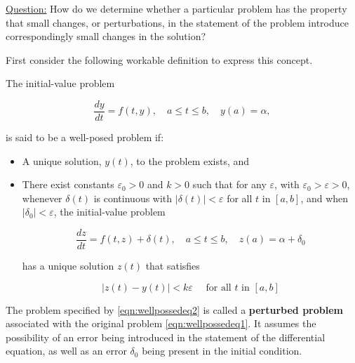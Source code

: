 \begin{boxB}
\underline{Question:} How do we determine whether a particular problem has the property that small changes, or perturbations, in the statement of the problem introduce correspondingly small changes in the solution?
\end{boxB}

First consider the following workable definition to express this concept.

\begin{definition} 
The initial-value problem

\begin{equation}\label{eqn:wellpossedeq1}
\frac{d y}{d t}=f(t, y), \quad a \leq t \leq b, \quad y(a)=\alpha,
\end{equation}

is said to be a well-posed problem if:

\begin{itemize}
  \item A unique solution, $y(t)$, to the problem exists, and
  \item There exist constants $\varepsilon_{0}>0$ and $k>0$ such that for any $\varepsilon$, with $\varepsilon_{0}>\varepsilon>0$, whenever $\delta(t)$ is continuous with $|\delta(t)|<\varepsilon$ for all $t$ in $[a, b]$, and when $\left|\delta_{0}\right|<\varepsilon$, the initial-value problem


\begin{equation}\label{eqn:wellpossedeq2}
\frac{d z}{d t}=f(t, z)+\delta(t), \quad a \leq t \leq b, \quad z(a)=\alpha+\delta_{0}
\end{equation}

has a unique solution $z(t)$ that satisfies

$$
|z(t)-y(t)|<k \varepsilon \quad \text { for all } t \text { in }[a, b]
$$
\end{itemize}
\end{definition}
The problem specified by \ref{eqn:wellpossedeq2} is called a {\bf perturbed problem} associated with the original problem \ref{eqn:wellpossedeq1}. It assumes the possibility of an error being introduced in the statement of the differential equation, as well as an error $\delta_{0}$ being present in the initial condition.


